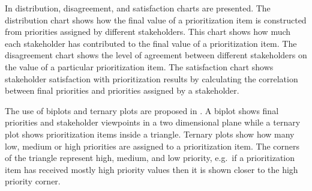 In \citep{Regnell2000} distribution, disagreement, and satisfaction charts are presented.
The distribution chart shows how the final value of a prioritization
item is constructed from priorities assigned by different stakeholders.
This chart shows how much each stakeholder has contributed to the
final value of a prioritization item.
The disagreement chart shows the level of agreement between different
stakeholders on the value of a particular prioritization item.
The satisfaction chart shows stakeholder satisfaction with prioritization
results by calculating the correlation between final priorities and priorities
assigned by a stakeholder.

The use of biplots and ternary plots are proposed in \citep{Chatzipetrou2010}. A biplot shows final priorities and stakeholder viewpoints in a two dimensional plane while a ternary plot shows prioritization items inside a triangle. Ternary plots show how many low, medium or high priorities are assigned to
a prioritization item. The corners of the triangle represent high, medium, and low priority, e.g.\ if a prioritization item has received mostly high priority values then it is shown closer to the high priority corner.

